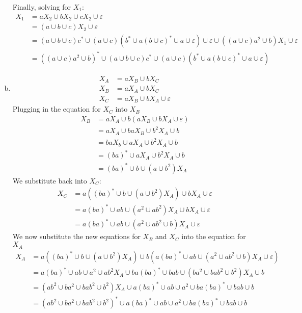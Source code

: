 \begin{solution}
\begin{enumerate}[(a)]
    Finally, solving for $X_1$:
    \begin{align*}
        X_1 &= aX_2\cup bX_2\cup cX_2\cup\varepsilon\\
            &= (a\cup b\cup c)X_2\cup\varepsilon\\
            &= (a\cup b\cup c)c^*\cup (a\cup c)(b^*\cup a(b\cup c)^*\cup a\cup\varepsilon)\cup\varepsilon\cup((a\cup c)a^2\cup b)X_1\cup\varepsilon\\
            &= ((a\cup c)a^2\cup b)^*\cup(a\cup b\cup c)c^*\cup (a\cup c)(b^*\cup a(b\cup c)^*\cup a\cup\varepsilon)
    \end{align*}
        \item
    \begin{align*}
        X_A &= aX_B\cup bX_C\\
        X_B &= aX_A\cup bX_C\\
        X_C &= aX_B\cup bX_A\cup\varepsilon
    \end{align*}
    Plugging in the equation for $X_C$ into $X_B$
    \begin{align*}
        X_B &= aX_A\cup b(aX_B\cup bX_A\cup\varepsilon)\\
            &= aX_A\cup baX_B\cup b^2X_A\cup b\\
            &= baX_b\cup aX_A\cup b^2X_A\cup b\\
            &= (ba)^*\cup aX_A\cup b^2X_A\cup b\\
            &= (ba)^*\cup b\cup (a\cup b^2)X_A
    \end{align*}
    We substitute back into $X_C$:
    \begin{align*}
        X_C &= a((ba)^*\cup b\cup (a\cup b^2)X_A)\cup bX_A\cup\varepsilon\\
            &= a(ba)^*\cup ab\cup (a^2\cup ab^2)X_A\cup bX_A\cup\varepsilon\\
            &= a(ba)^*\cup ab\cup (a^2\cup ab^2\cup b)X_A\cup\varepsilon
    \end{align*}
    We now substitute the new equations for $X_B$ and $X_C$ into the equation for $X_A$
    \begin{align*}
        X_A &= a\left((ba)^*\cup b\cup (a\cup b^2)X_A\right)\cup b(a(ba)^*\cup ab\cup (a^2\cup ab^2\cup b)X_A\cup\varepsilon)\\
            &= a(ba)^*\cup ab\cup a^2\cup ab^2X_A\cup ba(ba)^*\cup bab \cup (ba^2\cup bab^2\cup b^2)X_A\cup b\\
            &= (ab^2\cup ba^2\cup bab^2\cup b^2)X_A\cup a(ba)^*\cup ab\cup a^2\cup ba(ba)^*\cup bab \cup b\\
            &= (ab^2\cup ba^2\cup bab^2\cup b^2)^*\cup a(ba)^*\cup ab\cup a^2\cup ba(ba)^*\cup bab \cup b
    \end{align*}
    \end{enumerate}
\end{solution}
